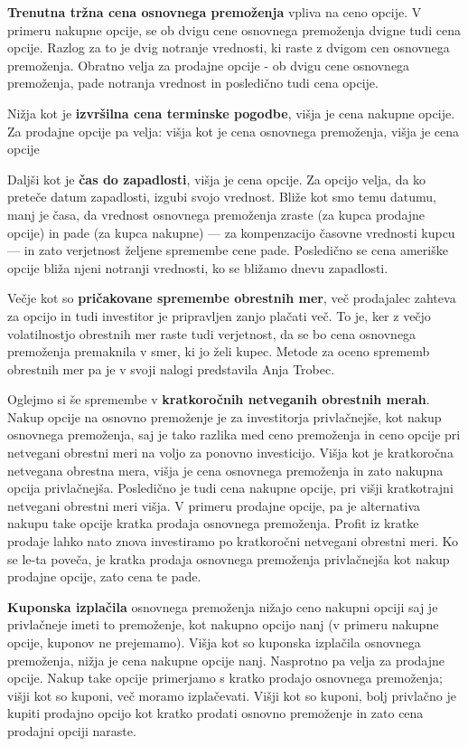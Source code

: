 \documentclass[a4paper]{article}
\begin{document}
\textbf{Trenutna tržna cena osnovnega premoženja} vpliva na ceno opcije. V primeru nakupne opcije, se ob dvigu cene osnovnega premoženja
dvigne tudi cena opcije. Razlog za to je dvig notranje vrednosti, ki raste z dvigom cen osnovnega premoženja. Obratno velja za prodajne
opcije - ob dvigu cene osnovnega premoženja, pade notranja vrednost in posledično tudi cena opcije.

Nižja kot je \textbf{izvršilna cena terminske pogodbe}, višja je cena nakupne opcije. Za prodajne opcije pa velja: višja kot je cena 
osnovnega premoženja, višja je cena opcije

Daljši kot je \textbf{čas do zapadlosti}, višja je cena opcije. Za opcijo velja, da ko preteče datum zapadlosti, izgubi svojo vrednost.
Bliže kot smo temu datumu, manj je časa, da vrednost osnovnega premoženja zraste (za kupca prodajne opcije) in pade (za kupca nakupne) ---
za kompenzacijo časovne vrednosti kupcu --- in zato verjetnost željene spremembe cene pade. Posledično se cena ameriške opcije bliža njeni
notranji vrednosti, ko se bližamo dnevu zapadlosti.

Večje kot so \textbf{pričakovane spremembe obrestnih mer}, več prodajalec zahteva za opcijo in tudi investitor je pripravljen
zanjo plačati več. To je, ker z večjo volatilnostjo obrestnih mer raste tudi verjetnost, da se bo cena osnovnega premoženja premaknila
v smer, ki jo želi kupec. Metode za oceno sprememb obrestnih mer pa je v svoji nalogi predstavila Anja Trobec.

Oglejmo si še spremembe v \textbf{kratkoročnih netveganih obrestnih merah}. Nakup opcije na osnovno premoženje 
je za investitorja privlačnejše, kot nakup osnovnega premoženja, saj je tako razlika med ceno 
premoženja in ceno opcije pri netvegani obrestni meri na voljo za ponovno investicijo. Višja kot je kratkoročna netvegana 
obrestna mera, višja je cena osnovnega premoženja in zato nakupna opcija privlačnejša. Posledično je tudi cena nakupne opcije, pri 
višji kratkotrajni netvegani obrestni meri višja. V primeru prodajne opcije, pa je alternativa nakupu take opcije kratka prodaja
osnovnega premoženja. Profit iz kratke prodaje lahko nato znova investiramo po kratkoročni netvegani obrestni meri. Ko se le-ta poveča,
je kratka prodaja osnovnega premoženja privlačnejša kot nakup prodajne opcije, zato cena te pade.

\textbf{Kuponska izplačila} osnovnega premoženja nižajo ceno nakupni opciji saj je privlačneje imeti to premoženje, kot nakupno 
opcijo nanj (v primeru nakupne opcije, kuponov ne prejemamo). Višja kot so kuponska izplačila osnovnega premoženja, nižja je cena
nakupne opcije nanj. Nasprotno pa velja za prodajne opcije. Nakup take opcije primerjamo s kratko prodajo osnovnega premoženja;
višji kot so kuponi, več moramo izplačevati. Višji kot so kuponi, bolj privlačno je kupiti prodajno opcijo kot kratko prodati osnovno
premoženje in zato cena prodajni opciji naraste.
\end{document}
